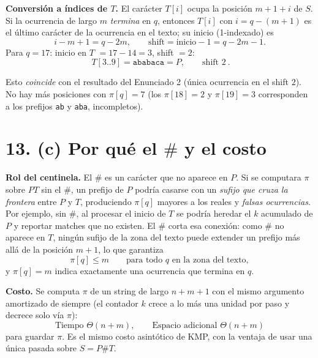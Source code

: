 \documentclass[11pt]{article}
\begin{document}
\noindent\textbf{Conversión a índices de \(T\).} El carácter \(T[i]\) ocupa la posición \(m+1+i\) de \(S\). Si la ocurrencia de largo \(m\) \emph{termina} en \(q\), entonces \(T[i]\) con \(i = q - (m+1)\) es el último carácter de la ocurrencia en el texto; su inicio (1-indexado) es
\[
i - m + 1 = q - 2m, \qquad \text{shift} = \text{inicio} - 1 = q - 2m - 1.
\]
Para \(q=17\): inicio en \(T\) \(= 17 - 14 = 3\), shift \(= 2\):
\[
\boxed{\ T[3..9] = \texttt{ababaca} = P,\qquad \text{shift } 2\ }.
\]

Esto \emph{coincide} con el resultado del Enunciado 2 (única ocurrencia en el shift \(2\)). No hay más posiciones con \(\pi[q]=7\) (los \(\pi[18]=2\) y \(\pi[19]=3\) corresponden a los prefijos \texttt{ab} y \texttt{aba}, incompletos).

\section*{13. (c) Por qué el \(\#\) y el costo}

\noindent\textbf{Rol del centinela.} El \(\#\) es un carácter que no aparece en \(P\). Si se computara \(\pi\) sobre \(PT\) sin el \(\#\), un prefijo de \(P\) podría casarse con un \emph{sufijo que cruza la frontera} entre \(P\) y \(T\), produciendo \(\pi[q]\) mayores a los reales y \emph{falsas ocurrencias}. Por ejemplo, sin \(\#\), al procesar el inicio de \(T\) se podría heredar el \(k\) acumulado de \(P\) y reportar matches que no existen. El \(\#\) corta esa conexión: como \(\#\) no aparece en \(T\), ningún sufijo de la zona del texto puede extender un prefijo más allá de la posición \(m+1\), lo que garantiza
\[
\pi[q] \le m \qquad \text{para todo } q \text{ en la zona del texto},
\]
y \(\pi[q]=m\) indica exactamente una ocurrencia que termina en \(q\).

\smallskip
\noindent\textbf{Costo.} Se computa \(\pi\) de un string de largo \(n+m+1\) con el mismo argumento amortizado de siempre (el contador \(k\) crece a lo más una unidad por paso y decrece solo vía \(\pi\)):
\[
\boxed{\ \text{Tiempo } \Theta(n+m),\qquad \text{Espacio adicional } \Theta(n+m)\ }
\]
para guardar \(\pi\). Es el mismo costo asintótico de KMP, con la ventaja de usar una única pasada sobre \(S=P\#T\).
\end{document}
